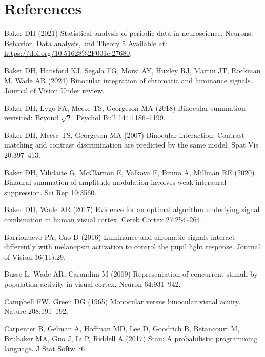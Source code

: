 \documentclass[
]{article}
\begin{document}
\hypertarget{references}{%
\section{References}\label{references}}

\hypertarget{refs}{}
\leavevmode\hypertarget{ref-Baker2021}{}%
Baker DH (2021) Statistical analysis of periodic data in neuroscience. Neurons, Behavior, Data analysis, and Theory 5 Available at: \url{https://doi.org/10.51628\%2F001c.27680}.

\leavevmode\hypertarget{ref-Baker2024}{}%
Baker DH, Hansford KJ, Segala FG, Morsi AY, Huxley RJ, Martin JT, Rockman M, Wade AR (2024) Binocular integration of chromatic and luminance signals. Journal of Vision Under review.

\leavevmode\hypertarget{ref-Baker2018}{}%
Baker DH, Lygo FA, Meese TS, Georgeson MA (2018) Binocular summation revisited: Beyond \(\sqrt{2}\). Psychol Bull 144:1186--1199.

\leavevmode\hypertarget{ref-Baker2007}{}%
Baker DH, Meese TS, Georgeson MA (2007) Binocular interaction: Contrast matching and contrast discrimination are predicted by the same model. Spat Vis 20:397--413.

\leavevmode\hypertarget{ref-Baker2020}{}%
Baker DH, Vilidaite G, McClarnon E, Valkova E, Bruno A, Millman RE (2020) Binaural summation of amplitude modulation involves weak interaural suppression. Sci Rep 10:3560.

\leavevmode\hypertarget{ref-Baker2017}{}%
Baker DH, Wade AR (2017) Evidence for an optimal algorithm underlying signal combination in human visual cortex. Cereb Cortex 27:254--264.

\leavevmode\hypertarget{ref-Barrionuevo2016}{}%
Barrionuevo PA, Cao D (2016) Luminance and chromatic signals interact differently with melanopsin activation to control the pupil light response. Journal of Vision 16(11):29.

\leavevmode\hypertarget{ref-Busse2009}{}%
Busse L, Wade AR, Carandini M (2009) Representation of concurrent stimuli by population activity in visual cortex. Neuron 64:931--942.

\leavevmode\hypertarget{ref-Campbell1965}{}%
Campbell FW, Green DG (1965) Monocular versus binocular visual acuity. Nature 208:191--192.

\leavevmode\hypertarget{ref-Carpenter2017}{}%
Carpenter B, Gelman A, Hoffman MD, Lee D, Goodrich B, Betancourt M, Brubaker MA, Guo J, Li P, Riddell A (2017) Stan: A probabilistic programming language. J Stat Softw 76.
\end{document}
